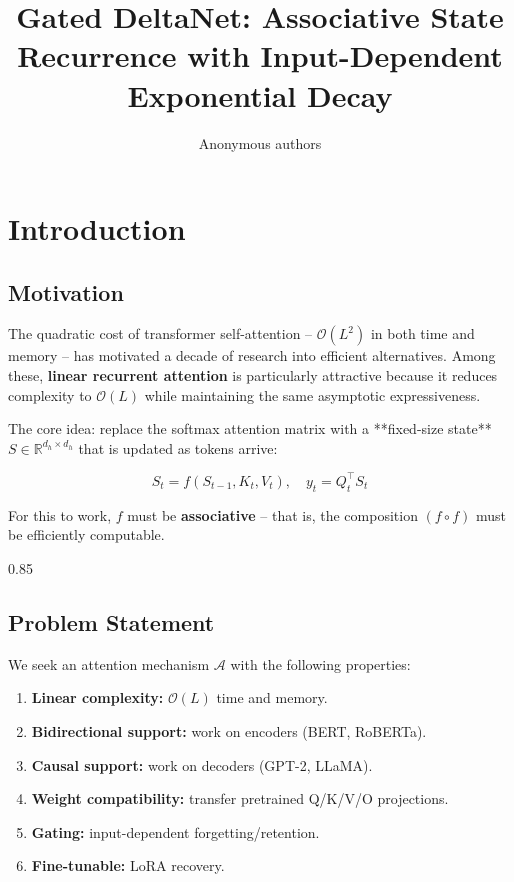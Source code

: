 \title{\textbf{Gated DeltaNet: Associative State Recurrence with Input-Dependent Exponential Decay}}

\author{Anonymous authors}



\section{Introduction}

\subsection{Motivation}

The quadratic cost of transformer self-attention -- $\mathcal{O}(L^2)$ in 
both time and memory -- has motivated a decade of research into efficient 
alternatives. Among these, \textbf{linear recurrent attention} is particularly 
attractive because it reduces complexity to $\mathcal{O}(L)$ while 
maintaining the same asymptotic expressiveness.

The core idea: replace the softmax attention matrix with a **fixed-size 
state** $S \in \mathbb{R}^{d_h \times d_h}$ that is updated as tokens arrive:

\[
S_t = f(S_{t-1}, K_t, V_t), \quad y_t = Q_t^\top S_t
\tag{1.1}
\]

For this to work, $f$ must be \textbf{associative} -- that is, the composition 
$(f \circ f)$ must be efficiently computable.

0.85


\subsection{Problem Statement}

We seek an attention mechanism $\mathcal{A}$ with the following properties:

\begin{enumerate}
\item \textbf{Linear complexity:} $\mathcal{O}(L)$ time and memory.
\item \textbf{Bidirectional support:} work on encoders (BERT, RoBERTa).
\item \textbf{Causal support:} work on decoders (GPT-2, LLaMA).
\item \textbf{Weight compatibility:} transfer pretrained Q/K/V/O projections.
\item \textbf{Gating:} input-dependent forgetting/retention.
\item \textbf{Fine-tunable:} LoRA recovery.

\end{enumerate}
